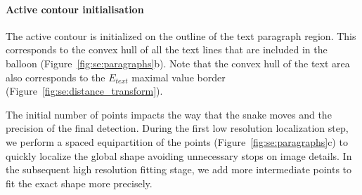 \paragraph{Active contour initialisation}
\label{sec:se:cont_init}

The active contour is initialized on the outline of the text paragraph region.
This corresponds to the convex hull of all the text lines that are included in the balloon (Figure~\ref{fig:se:paragraphs}b).
Note that the convex hull of the text area also corresponds to the $E_{text}$ maximal value border (Figure~\ref{fig:se:distance_transform}).



The initial number of points impacts the way that the snake moves and the precision of the final detection.
During the first low resolution localization step, we perform a spaced equipartition of the points (Figure~\ref{fig:se:paragraphs}c) to quickly localize the global shape avoiding unnecessary stops on image details.
In the subsequent high resolution fitting stage, we add more intermediate points to fit the exact shape more precisely.

